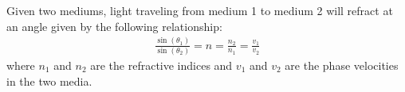 \begin{fancybox}{1}
    Given two mediums, light traveling from medium 1 to medium 2 will refract at an angle given by the following relationship:
    \begin{align}
        \frac{\sin(\theta_1)}{\sin(\theta_2)} = n = \frac{n_2}{n_1} = \frac{v_1}{v_2} \label{Snell's Law Eqn}
    \end{align}
    where $n_1$ and $n_2$ are the refractive indices and $v_1$ and $v_2$ are the phase velocities in the two media.
\end{fancybox}


